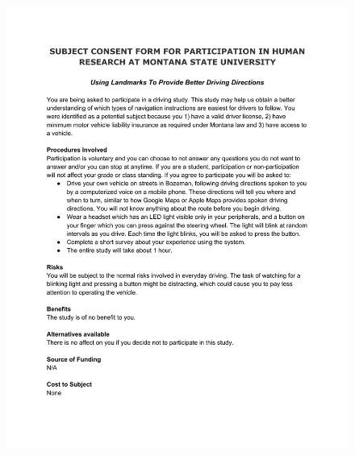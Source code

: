 \begin{figure}[htop]
 \centering 
 \includegraphics[page=2, width=\textwidth]{images/consent_form.pdf}
\end{figure}
